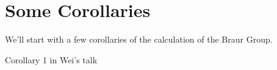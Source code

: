 
%
%




\newcommand{\category}[1]{\textsf{#1}}









\title{}
\author{Jack J Garzella}




\section{Some Corollaries}


We'll start with a few corollaries of the calculation of the Braur Group.

Corollary 1 in Wei's talk


